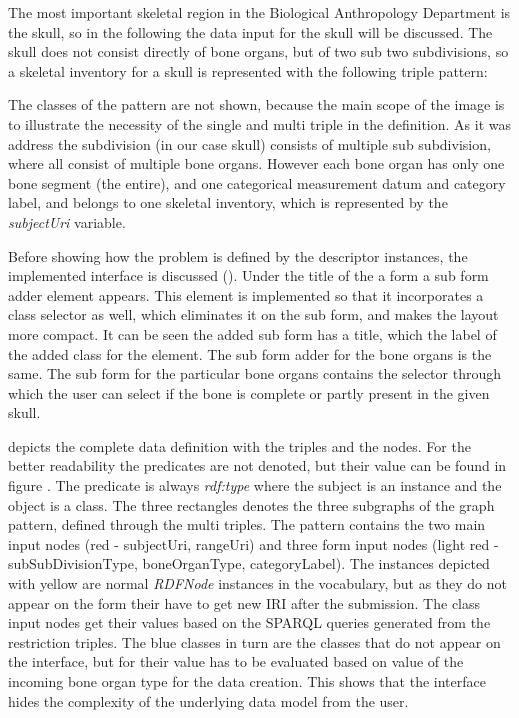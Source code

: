 The most important skeletal region in the Biological Anthropology Department is the skull, so in the following the data input for the skull will be discussed. The skull does not consist directly of bone organs, but of two sub two subdivisions, so a skeletal inventory for a skull is represented with the following triple pattern: 


The classes of the pattern are not shown, because the main scope of the image is to illustrate the necessity of the single and multi triple in the definition. As it was address the subdivision (in our case skull) consists of multiple sub subdivision, where all consist of multiple bone organs. However each bone organ has only one bone segment (the entire), and one categorical measurement datum and category label, and belongs to one skeletal inventory, which is represented by the \textit{subjectUri} variable.

Before showing how the problem is defined by the descriptor instances, the implemented interface is discussed (). Under the title of the a form a sub form adder element appears. This element is implemented so that it incorporates a class selector as well, which eliminates it on the sub form, and makes the layout more compact. It can be seen the added sub form has a title, which the label of the added class for the element. The sub form adder for the bone organs is the same. The sub form for the particular bone organs contains the selector through which the user can select if the bone is complete or partly present in the given skull.


 depicts the complete data definition with the triples and the nodes. For the better readability the predicates are not denoted, but their value can be found in figure . The predicate is always \textit{rdf:type} where the subject is an instance and the object is a class. The three rectangles denotes the three subgraphs of the graph pattern, defined through the multi triples. The pattern contains the two main input nodes (red - subjectUri, rangeUri) and three form input nodes (light red - subSubDivisionType, boneOrganType, categoryLabel). The instances depicted with yellow are normal \textit{RDFNode} instances in the vocabulary, but as they do not appear on the form their have to get new IRI after the submission. The class input nodes get their values based on the SPARQL queries generated from the restriction triples. The blue classes in turn are the classes that do not appear on the interface, but for their value has to be evaluated based on value of the incoming bone organ type for the data creation. This shows that the interface hides the complexity of the underlying data model from the user.

